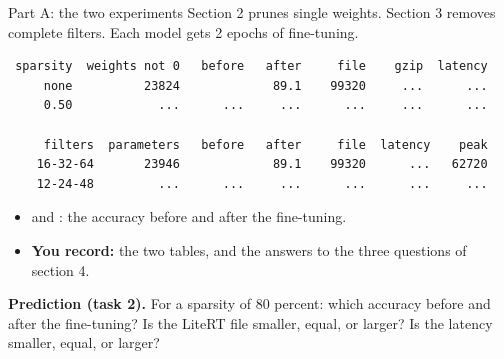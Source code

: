 \begin{frame}[fragile]{Part A: the two experiments}
  \small
  Section 2 prunes single weights. Section 3 removes complete filters. Each
  model gets 2 epochs of fine-tuning.
\begin{lstlisting}
 sparsity  weights not 0   before   after     file    gzip  latency
     none          23824             89.1    99320     ...      ...
     0.50            ...      ...     ...      ...     ...      ...

     filters  parameters   before   after     file  latency    peak
    16-32-64       23946             89.1    99320      ...   62720
    12-24-48         ...      ...     ...      ...      ...     ...
\end{lstlisting}
  \begin{itemize}
    \item {} and : the accuracy before and after the
          fine-tuning.
    \item \textbf{You record:} the two tables, and the answers to the three
          questions of section 4.
  \end{itemize}
  \begin{exerciseblock}
    \textbf{Prediction (task 2).} For a sparsity of 80 percent: which
    accuracy before and after the fine-tuning? Is the LiteRT file smaller,
    equal, or larger? Is the latency smaller, equal, or larger?
  \end{exerciseblock}
\end{frame}


